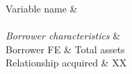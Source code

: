 
	Variable name &   \\ 
	\hline \\[-1.8ex] 
	\textit{Borrower characteristics} & \\
			\hspace{10 mm} Borrower FE & Total assets\\ 
			\hspace{10 mm} Relationship acquired & XX\\ 
		










